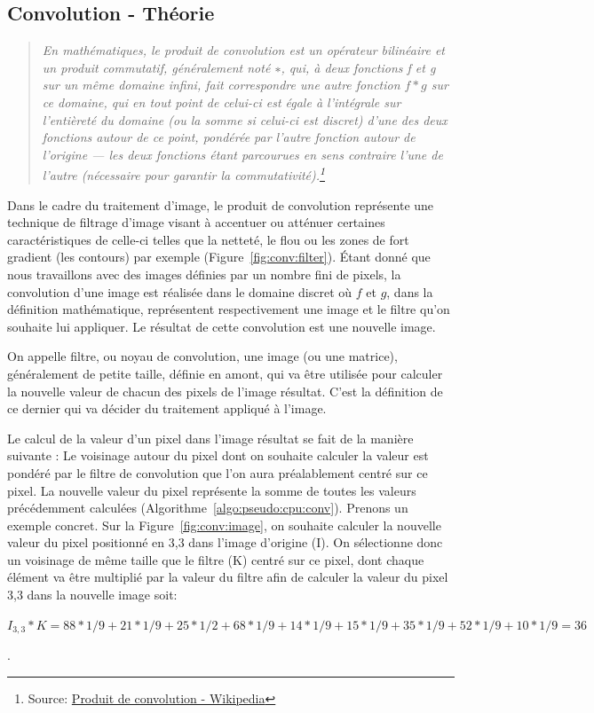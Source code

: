 \subsection{Convolution - Théorie}
\label{ssec:convtheo}
\begin{quotation}
\textit{En mathématiques, le produit de convolution est un opérateur bilinéaire et un produit commutatif, généralement noté $∗$, qui, à deux fonctions f et g sur un même domaine infini, fait correspondre une autre fonction $f * g$ sur ce domaine, qui en tout point de celui-ci est égale à l'intégrale sur l'entièreté du domaine (ou la somme si celui-ci est discret) d'une des deux fonctions autour de ce point, pondérée par l'autre fonction autour de l'origine — les deux fonctions étant parcourues en sens contraire l'une de l'autre (nécessaire pour garantir la commutativité).\footnote{Source: \href{https://fr.wikipedia.org/wiki/Produit_de_convolution}{Produit de convolution - Wikipedia}}}
\end{quotation}

Dans le cadre du traitement d'image, le produit de convolution représente une technique de filtrage d'image visant à accentuer ou atténuer certaines caractéristiques de celle-ci telles que la netteté, le flou ou les zones de fort gradient (les contours) par exemple (Figure~\ref{fig:conv:filter}). Étant donné que nous travaillons avec des images définies par un nombre fini de pixels, la convolution d'une image est réalisée dans le domaine discret où $f$ et $g$, dans la définition mathématique, représentent respectivement une image et le filtre qu'on souhaite lui appliquer. Le résultat de cette convolution est une nouvelle image.

On appelle filtre, ou noyau de convolution, une image (ou une matrice), généralement de petite taille, définie en amont, qui va être utilisée pour calculer la nouvelle valeur de chacun des pixels de l'image résultat. C'est la définition de ce dernier qui va décider du traitement appliqué à l'image. 

Le calcul de la valeur d'un pixel dans l'image résultat se fait de la manière suivante : Le voisinage autour du pixel dont on souhaite calculer la valeur est pondéré par le filtre de convolution que l'on aura préalablement centré sur ce pixel. La nouvelle valeur du pixel représente la somme de toutes les valeurs précédemment calculées (Algorithme~\ref{algo:pseudo:cpu:conv}). Prenons un exemple concret. Sur la Figure~\ref{fig:conv:image}, on souhaite calculer la nouvelle valeur du pixel positionné en 3,3 dans l'image d'origine (I). On sélectionne donc un voisinage de même taille que le filtre (K) centré sur ce pixel, dont chaque élément va être multiplié par la valeur du filtre afin de calculer la valeur du pixel 3,3 dans la nouvelle image soit: 
\begin{center}
$I_{3,3} * K = 88 * 1/9 + 21 * 1/9 + 25 * 1/2 + 68 * 1/9 + 14 * 1/9 + 15 * 1/9 + 35 * 1/9 + 52 * 1/9 + 10 * 1/9 = 36$
\end{center}.

